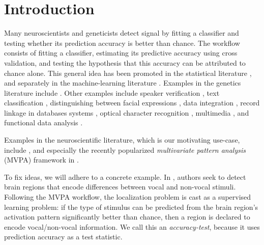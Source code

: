 \documentclass[]{bio}
\begin{document}
\section{Introduction}
\label{sec:introduction}

Many neuroscientists and geneticists detect signal by fitting a classifier and testing whether its prediction accuracy is better than chance. 
The workflow consists of fitting a classifier, estimating its predictive accuracy using cross validation, and testing the hypothesis that this accuracy can be attributed to chance alone. 
This general idea has been promoted in the statistical literature \citep{friedman2003multivariate}, and separately in the machine-learning literature \citep{eric2008testing,ojala_permutation_2010,lopez2016revisiting}.
Examples in the genetics literature include \cite{golub_molecular_1999,slonim_class_2000,radmacher_paradigm_2002,mukherjee_estimating_2003,juan_prediction_2004,jiang_calculating_2008,yu2007two}.
Other examples include 
speaker verification \citep{gretton_kernel_2012-1}, 
text classification \citep{dhillon2003divisive,lopez2016revisiting}, 
distinguishing between facial expressions \citep{lopez2016revisiting}, 
data integration \citep{gretton_kernel_2012-1}, 
record linkage in databases systems \citep{gretton_kernel_2012-1,hall2002permutation,zhou2018statistical}, 
optical character recognition \citep{perez2009estimation}, 
multimedia \citep{moreno2004kullback}, 
and functional data analysis \citep{hall2002permutation}.

Examples in the neuroscientific literature, which is our motivating use-case, include \cite{golland_permutation_2003,pereira_machine_2009,schreiber2013statistical,olivetti2013kernel,varoquaux_assessing_2016}, and especially the recently popularized \emph{multivariate pattern analysis} (MVPA) framework in \cite{kriegeskorte_information-based_2006}.

To fix ideas, we will adhere to a concrete example.
In \cite{gilron_quantifying_2016}, authors seek to detect brain regions that encode differences between vocal and non-vocal stimuli. 
Following the MVPA workflow, the localization problem is cast as a supervised learning problem: if the type of stimulus can be predicted from the brain region's activation pattern significantly better than chance, then a region is declared to encode vocal/non-vocal information. 
We call this an \emph{accuracy-test}, because it uses prediction accuracy as a test statistic. 
\end{document}
